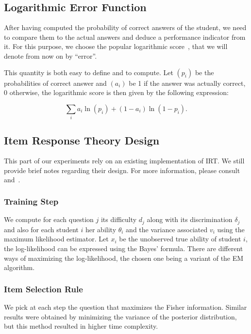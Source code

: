 \documentclass{sig-alternate}
\begin{document}
\subsection{Logarithmic Error Function}

After having computed the probability of correct answers of the student, we need to compare them to the actual answers and deduce a performance indicator from it. For this purpose, we choose the popular logarithmic score~\citep{Gneiting2007}, that we will denote from now on by ``error''.

This quantity is both easy to define and to compute. Let $(p_i)$ be the probabilities of correct answer and $(a_i)$ be 1 if the answer was actually correct, 0 otherwise, the logarithmic score is then given by the following expression: 

\[ \sum_i a_i\ln(p_i) + (1-a_i)\ln(1-p_i).\]

\subsection{Item Response Theory Design}

This part of our experiments rely on an existing implementation of IRT. We still provide brief notes regarding their design. For more information, please consult \citep{Rizopoulos2006} and~\citep{MagisRaiche2012}.

\subsubsection{Training Step}

We compute for each question $j$ its difficulty $d_j$ along with its discrimination $\delta_j$ and also for each student $i$ her ability $\theta_i$ and the variance associated $v_i$ using the maximum likelihood estimator. Let $x_i$ be the unobserved true ability of student $i$, the log-likelihood can be expressed using the Bayes' formula. There are different ways of maximizing the log-likelihood, the chosen one being a variant of the EM algorithm.

\subsubsection{Item Selection Rule}

We pick at each step the question that maximizes the Fisher information. Similar results were obtained by minimizing the variance of the posterior distribution, but this method resulted in higher time complexity.
\end{document}
